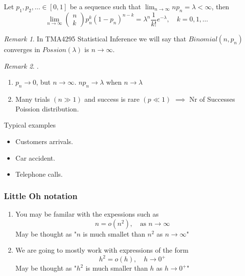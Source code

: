 \documentclass{article}
\theoremstyle{remark}
\newtheorem*{remark}{Remark}
\begin{document}
\begin{theorem}
  Let $p_{1}, p_{2}, \ldots \in  \left[ 0,1 \right]$ be a sequence such that $\lim_{n \to  \infty} n p_{n} = \lambda  < \infty $, then \[
  \lim_{n\to \infty}  \begin{pmatrix}
  n \\
  k
  \end{pmatrix} 
  p^{k}_{n} \left( 1-p_{n} \right) ^{n-k} = \lambda ^{n} \frac{1}{k!}  e^{-\lambda } , \quad  k=0,1 , \ldots 
  \] 
\end{theorem}
\begin{remark}
  In TMA4295 Statistical Inference we will say that $Binomial\left( n, p_{n} \right)$ converges in $Possion\left( \lambda  \right)$ is $n\to \infty$.
\end{remark}
 
\begin{remark}
  .
  \begin{enumerate}[label=(\roman*)]
    \item $p_{n } \to  0$, but $n\to \infty$. $np_{n} \to  \lambda $ when $n\to \lambda $
    \item Many trials $\left( n\gg 1 \right) $ and success is rare $\left( p \ll  1 \right)$ $\implies$  Nr of Successes Poission distribution.
  \end{enumerate}
\end{remark}

Typical examples 
\begin{itemize}
  \item Customers arrivals.
  \item Car accident.
  \item Telephone calls.
\end{itemize}

\subsubsection{Little Oh notation}%
\label{ssub:little_oh_notation}

\begin{enumerate}[label=(\roman*)]
  \item
You may be familar with the expessions such as \[
n = o\left( n^2 \right), \quad \text{as } n\to \infty 
\] 
May be thought as  "$n$ is much smallet than $n^2$ as $n\to  \infty$"
\item 
We are going to mostly work with expressions of the form \[
h^2 = o\left( h \right) , \quad  h \to  0^{+} 
\] 
May be thought as "$h^2$ is much smaller than $h$ as $h \to  0^{+}$"

\end{enumerate}
\end{document}

